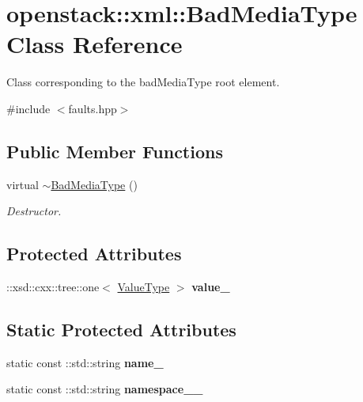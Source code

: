 \hypertarget{classopenstack_1_1xml_1_1BadMediaType}{
\section{openstack::xml::BadMediaType Class Reference}
\label{classopenstack_1_1xml_1_1BadMediaType}
}


Class corresponding to the badMediaType root element.  




{\ttfamily \#include $<$faults.hpp$>$}

\subsection*{Public Member Functions}
\begin{DoxyCompactItemize}
\item 
\hypertarget{classopenstack_1_1xml_1_1BadMediaType_abbc5646e1c3685955217bae1bb5dbe74}{
virtual \hyperlink{classopenstack_1_1xml_1_1BadMediaType_abbc5646e1c3685955217bae1bb5dbe74}{$\sim$BadMediaType} ()}
\label{classopenstack_1_1xml_1_1BadMediaType_abbc5646e1c3685955217bae1bb5dbe74}

\begin{DoxyCompactList}\small\item\em Destructor. \item\end{DoxyCompactList}\end{DoxyCompactItemize}
\subsection*{Protected Attributes}
\begin{DoxyCompactItemize}
\item 
\hypertarget{classopenstack_1_1xml_1_1BadMediaType_a8c24555d5d00a7a7d81c7ed579e4a556}{
::xsd::cxx::tree::one$<$ \hyperlink{classopenstack_1_1xml_1_1BadMediaTypeAPIFault}{ValueType} $>$ {\bfseries value\_\-}}
\label{classopenstack_1_1xml_1_1BadMediaType_a8c24555d5d00a7a7d81c7ed579e4a556}

\end{DoxyCompactItemize}
\subsection*{Static Protected Attributes}
\begin{DoxyCompactItemize}
\item 
\hypertarget{classopenstack_1_1xml_1_1BadMediaType_a8adb3c5374b1bfd146208a794216e436}{
static const ::std::string {\bfseries name\_\-}}
\label{classopenstack_1_1xml_1_1BadMediaType_a8adb3c5374b1bfd146208a794216e436}

\item 
\hypertarget{classopenstack_1_1xml_1_1BadMediaType_a8caf7f8b8db3c400de50effc35eac166}{
static const ::std::string {\bfseries namespace\_\-\_\-}}
\label{classopenstack_1_1xml_1_1BadMediaType_a8caf7f8b8db3c400de50effc35eac166}

\end{DoxyCompactItemize}
